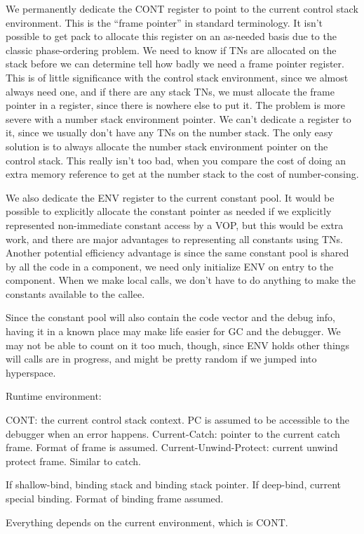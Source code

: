 {\begin{itemize, spread 0, spacing 1}
We permanently dedicate the CONT register to point to the current control stack
environment.  This is the ``frame pointer'' in standard terminology.  It isn't
possible to get pack to allocate this register on an as-needed basis due to the
classic phase-ordering problem.  We need to know if TNs are allocated on the
stack before we can determine tell how badly we need a frame pointer register.
This is of little significance with the control stack environment, since we
almost always need one, and if there are any stack TNs, we must allocate the
frame pointer in a register, since there is nowhere else to put it.  The
problem is more severe with a number stack environment pointer.  We can't
dedicate a register to it, since we usually don't have any TNs on the number
stack.  The only easy solution is to always allocate the number stack
environment pointer on the control stack.  This really isn't too bad, when you
compare the cost of doing an extra memory reference to get at the number stack
to the cost of number-consing.

We also dedicate the ENV register to the current constant pool.  It would be
possible to explicitly allocate the constant pointer as needed if we explicitly
represented non-immediate constant access by a VOP, but this would be extra
work, and there are major advantages to representing all constants using TNs.
Another potential efficiency advantage is since the same constant pool is
shared by all the code in a component, we need only initialize ENV on entry to
the component.  When we make local calls, we don't have to do anything to make
the constants available to the callee.

Since the constant pool will also contain the code vector and the debug info,
having it in a known place may make life easier for GC and the debugger.  We
may not be able to count on it too much, though, since ENV holds other things
will calls are in progress, and might be pretty random if we jumped into
hyperspace.

Runtime environment:

CONT: the current control stack context.
PC is assumed to be accessible to the debugger when an error happens.
Current-Catch: pointer to the current catch frame.  Format of frame is assumed.
Current-Unwind-Protect: current unwind protect frame.  Similar to catch.

If shallow-bind, binding stack and binding stack pointer.
If deep-bind, current special binding.  Format of binding frame assumed.

Everything depends on the current environment, which is CONT.


\end{itemize, spread 0, spacing 1}}
